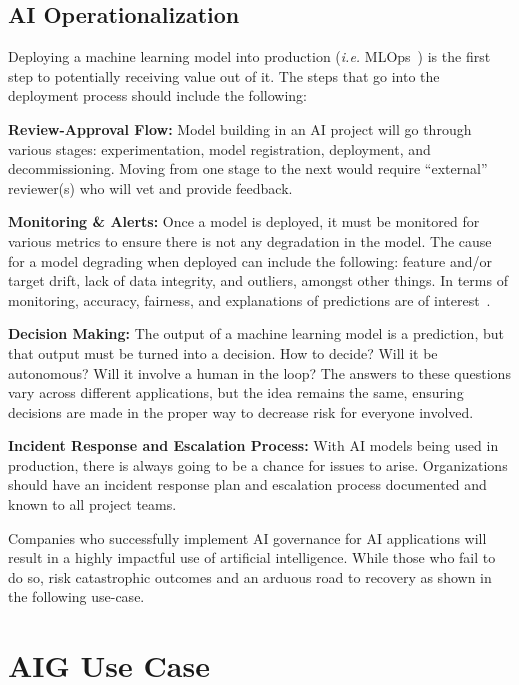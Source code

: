 \documentclass{article}
\begin{document}
\subsection{AI Operationalization}

Deploying a machine learning model into production (\emph{i.e.} MLOps~\cite{alla2021mlops, treveil2020introducing}) is the first step to potentially receiving value out of it. The steps that go into the deployment process should include the following: 

\textbf{Review-Approval Flow:} Model building in an AI project will go through various stages: experimentation, model registration, deployment, and decommissioning. Moving from one stage to the next would require ``external'' reviewer(s) who will vet and provide feedback.
    
\textbf{Monitoring \& Alerts:} Once a model is deployed, it must be monitored for various metrics to ensure there is not any degradation in the model. The cause for a model degrading when deployed can include the following: feature and/or target drift, lack of data integrity, and outliers, amongst other things. In terms of monitoring, accuracy, fairness, and explanations of predictions are of interest~\cite{amodei2016concrete, leike2017ai}. %
    
\textbf{Decision Making:} The output of a machine learning model is a prediction, but that output must be turned into a decision. How to decide? Will it be autonomous? Will it involve a human in the loop? The answers to these questions vary across different applications, but the idea remains the same, ensuring decisions are made in the proper way to decrease risk for everyone involved.
    
\textbf{Incident Response and Escalation Process:} With AI models being used in production, there is always going to be a chance for issues to arise. Organizations should have an incident response plan and escalation process documented and known to all project teams.

Companies who successfully implement AI governance for AI applications will result in a highly impactful use of artificial intelligence. While those who fail to do so, risk catastrophic outcomes and an arduous road to recovery as shown in the following use-case. 

\section{AIG Use Case}
\end{document}
